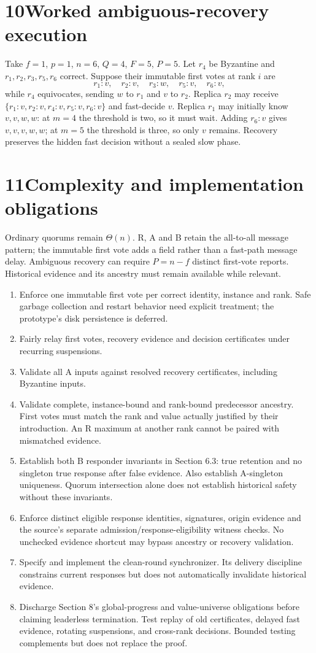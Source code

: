 \documentclass[11pt,a4paper]{article}
\newcommand{\page}[1]{\clearpage\setcounter{page}{#1}}
\begin{document}
\section*{10\quad Worked ambiguous-recovery execution}
Take $f=1$, $p=1$, $n=6$, $Q=4$, $F=5$, $P=5$. Let $r_4$ be Byzantine and $r_1,r_2,r_3,r_5,r_6$ correct. Suppose their immutable first votes at rank $i$ are
\[
r_1:v,\quad r_2:v,\quad r_3:w,\quad r_5:v,\quad r_6:v,
\]
while $r_4$ equivocates, sending $w$ to $r_1$ and $v$ to $r_2$.
\page{14}
Replica $r_2$ may receive $\{r_1:v,r_2:v,r_4:v,r_5:v,r_6:v\}$ and fast-decide $v$. Replica $r_1$ may initially know $v,v,w,w$: at $m=4$ the threshold is two, so it must wait. Adding $r_6:v$ gives $v,v,v,w,w$; at $m=5$ the threshold is three, so only $v$ remains. Recovery preserves the hidden fast decision without a sealed slow phase.
\section*{11\quad Complexity and implementation obligations}
Ordinary quorums remain $\Theta(n)$. R, A and B retain the all-to-all message pattern; the immutable first vote adds a field rather than a fast-path message delay. Ambiguous recovery can require $P=n-f$ distinct first-vote reports. Historical evidence and its ancestry must remain available while relevant.
\begin{enumerate}
\item Enforce one immutable first vote per correct identity, instance and rank. Safe garbage collection and restart behavior need explicit treatment; the prototype's disk persistence is deferred.
\item Fairly relay first votes, recovery evidence and decision certificates under recurring suspensions.
\item Validate all A inputs against resolved recovery certificates, including Byzantine inputs.
\item Validate complete, instance-bound and rank-bound predecessor ancestry. First votes must match the rank and value actually justified by their introduction. An R maximum at another rank cannot be paired with mismatched evidence.
\item Establish both B responder invariants in Section 6.3: true retention and no singleton true response after false evidence. Also establish A-singleton uniqueness. Quorum intersection alone does not establish historical safety without these invariants.
\item Enforce distinct eligible response identities, signatures, origin evidence and the source's separate admission/response-eligibility witness checks. No unchecked evidence shortcut may bypass ancestry or recovery validation.
\item Specify and implement the clean-round synchronizer. Its delivery discipline constrains current responses but does not automatically invalidate historical evidence.
\item Discharge Section 8's global-progress and value-universe obligations before claiming leaderless termination. Test replay of old certificates, delayed fast evidence, rotating suspensions, and cross-rank decisions. Bounded testing complements but does not replace the proof.
\end{enumerate}
\end{document}
